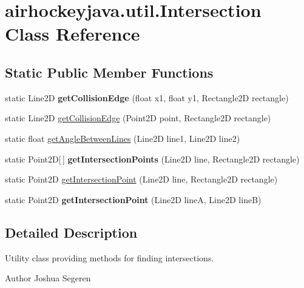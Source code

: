 \hypertarget{classairhockeyjava_1_1util_1_1_intersection}{}\section{airhockeyjava.\+util.\+Intersection Class Reference}
\label{classairhockeyjava_1_1util_1_1_intersection}
\subsection*{Static Public Member Functions}
\begin{DoxyCompactItemize}
\item 
\hypertarget{classairhockeyjava_1_1util_1_1_intersection_a2ded9b380aafd9989b7ce0e9fc37b771}{}static Line2\+D {\bfseries get\+Collision\+Edge} (float x1, float y1, Rectangle2\+D rectangle)\label{classairhockeyjava_1_1util_1_1_intersection_a2ded9b380aafd9989b7ce0e9fc37b771}

\item 
static Line2\+D \hyperlink{classairhockeyjava_1_1util_1_1_intersection_a7bc3475008f0627c8216effaee7931da}{get\+Collision\+Edge} (Point2\+D point, Rectangle2\+D rectangle)
\item 
static float \hyperlink{classairhockeyjava_1_1util_1_1_intersection_ad805d3323aaef487c10a7bbb96073694}{get\+Angle\+Between\+Lines} (Line2\+D line1, Line2\+D line2)
\item 
\hypertarget{classairhockeyjava_1_1util_1_1_intersection_a2295f2213c28cec543744289ca6a147f}{}static Point2\+D\mbox{[}$\,$\mbox{]} {\bfseries get\+Intersection\+Points} (Line2\+D line, Rectangle2\+D rectangle)\label{classairhockeyjava_1_1util_1_1_intersection_a2295f2213c28cec543744289ca6a147f}

\item 
static Point2\+D \hyperlink{classairhockeyjava_1_1util_1_1_intersection_abcd8db2ab228e83d4041fb622e438329}{get\+Intersection\+Point} (Line2\+D line, Rectangle2\+D rectangle)
\item 
\hypertarget{classairhockeyjava_1_1util_1_1_intersection_a0f984bf3be361faa2f97c8e867b37670}{}static Point2\+D {\bfseries get\+Intersection\+Point} (Line2\+D line\+A, Line2\+D line\+B)\label{classairhockeyjava_1_1util_1_1_intersection_a0f984bf3be361faa2f97c8e867b37670}

\end{DoxyCompactItemize}


\subsection{Detailed Description}
Utility class providing methods for finding intersections. \begin{DoxyAuthor}{Author}
Joshua Segeren 
\end{DoxyAuthor}


